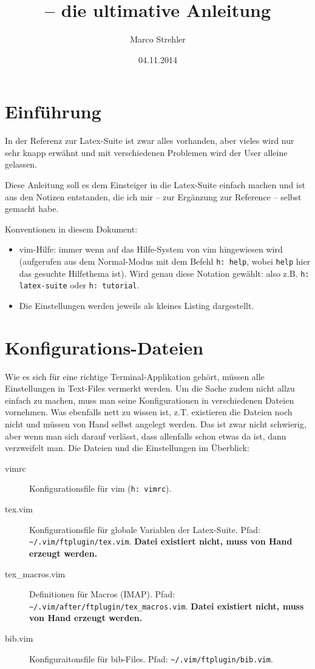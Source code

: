 \documentclass[a4paper,parskip=half,draft=true,DIV=15]{scrartcl}
\title{\LS{} -- die ultimative Anleitung}
\author{Marco Strehler}
\date{04.11.2014}
\newcommand{\LS}{Latex-Suite}
\newcommand{\vimhNP}[1]{\texttt{h: #1}}
\newcommand{\vimh}[1]{(\vimhNP{#1})}
\begin{document}
 

\maketitle

\section{Einführung}

In der Referenz zur \LS{} ist zwar alles vorhanden, aber vieles wird
nur sehr knapp erwähnt und mit verschiedenen Problemen wird der User alleine
gelassen.

Diese Anleitung soll es dem Einsteiger in die \LS{} einfach machen und
ist aus den Notizen entstanden, die ich mir -- zur Ergänzung zur Reference --
selbst gemacht habe.

Konventionen in diesem Dokument:

\begin{itemize}
  \item vim-Hilfe: immer wenn auf das Hilfe-System von vim hingewiesen wird
    (aufgerufen aus dem Normal-Modus mit dem Befehl \vimhNP{help}, wobei
    \texttt{help} hier das gesuchte Hilfethema ist). Wird genau diese Notation
    gewählt: also z.B. \vimhNP{latex-suite} oder \vimhNP{tutorial}.
  \item Die Einstellungen werden jeweils als kleines Listing dargestellt.
\end{itemize}

\section{Konfigurations-Dateien}

Wie es sich für eine richtige Terminal-Applikation gehört, müssen alle Einstellungen in Text-Files vermerkt werden.
Um die Sache zudem nicht allzu einfach zu machen, muss man seine Konfigurationen in verschiedenen Dateien vornehmen.
Was ebenfalls nett zu wissen ist, z.T. existieren die Dateien noch nicht und müssen von Hand selbst angelegt werden.
Das ist zwar nicht schwierig, aber wenn man sich darauf verlässt, dass allenfalls schon etwas da ist, dann verzweifelt man.
Die Dateien und die Einstellungen im Überblick:

\begin{description}
  \item[vimrc] Konfigurationsfile für vim \vimh{vimrc}.
  \item[tex.vim] Konfigurationsfile für globale Variablen der \LS.
    Pfad: \texttt{\textasciitilde/.vim/ftplugin/tex.vim}. \textbf{Datei existiert nicht, muss von Hand erzeugt werden.}
  \item[tex\_macros.vim] Definitionen für Macros (IMAP).
    Pfad: \texttt{\textasciitilde/.vim/after/ftplugin/tex\_macros.vim}. \textbf{Datei existiert nicht, muss von Hand erzeugt werden.}
	\item[bib.vim] Konfiguraitonsfile für bib-Files.
	  Pfad: \texttt{\textasciitilde/.vim/ftplugin/bib.vim}.
\end{description}
\end{document}
